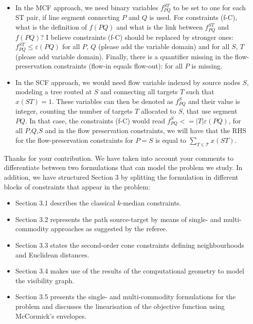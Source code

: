 \documentclass{article}
\newenvironment{reviewer}{\setcounter{pointcounter}{1}}{}
\newcommand{\point}{\text{{\selectfont \thepointcounter} \stepcounter{pointcounter}}}
\begin{document}
\begin{reviewer}
\begin{itshape}
			\begin{itemize}
				\item In the MCF approach, we need binary variables $f^{ST}_{PQ}$ to be set to one for each ST pair, if line segment connecting $P$ and $Q$ is used. For constraints (f-C), what is the definition of $f(PQ)$ and what is the link between $f^{ST}_{PQ}$ and $f(PQ)$? I believe constraints (f-C) should be replaced by stronger ones: $f^{ST}_{PQ}\leq \varepsilon(PQ)$ for all $P$, $Q$ (please add the variable domain) and for all $S$, $T$ (please add variable domain). Finally, there is a quantifier missing in the flow-preservation constraints (flow-in equals flow-out): for all $P$ is missing.
				\item In the SCF approach, we would need flow variable indexed by source nodes $S$, modeling a tree routed at $S$ and connecting all targets $T$ such that $x(ST)=1$. These variables can then be denoted as $f^S_{PQ}$ and their value is integer, counting the number of targets $T$ allocated to $S$, that use segment $PQ$. In that case, the constraints (f-C) would read $f^S_{PQ} <= |T| \varepsilon(PQ)$, for all $P$,$Q$,$S$ and in the flow preservation constraints, we will have that the RHS for the flow-preservation constraints for $P=S$ is equal to $\sum_{T \in \mathcal T} x(ST)$.
			\end{itemize}
		
		\end{itshape}


		\begin{tcolorbox}[breakable,enhanced,coltitle=black,colback=green!5!white,colframe=green!75!black,title=\textbf{Answer R2.\point},borderline={1pt}{0pt}{black},boxrule=0pt]
			Thanks for your contribution. We have taken into account your comments to differentiate between two formulations that can model the problem we study. In addition, we have structured Section 3 by splitting the formulation in different blocks of constraints that appear in the problem:
			\begin{itemize}
				\item Section 3.1 describes the classical $k$-median constraints.
				\item Section 3.2 represents the path source-target by means of single- and multi-commodity approaches as suggested by the referee.
				\item Section 3.3 states the second-order cone constraints defining neighbourhoods and Euclidean distances.
				\item Section 3.4 makes use of the results of the computational geometry to model the visibility graph.
				\item Section 3.5 presents the single- and multi-commodity formulations for the problem and discusses the linearisation of the objective function using McCormick's envelopes.
			\end{itemize}
		\end{tcolorbox}
		

\end{reviewer}
\end{document}
